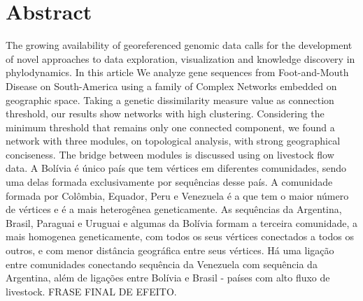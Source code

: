 \documentclass[10pt,letterpaper]{article}
\begin{document}
\section*{Abstract}
The growing availability of georeferenced genomic data calls for the development of novel approaches to data exploration, visualization and knowledge discovery in phylodynamics. In this article We analyze gene sequences from Foot-and-Mouth Disease on South-America using a family of Complex Networks embedded on geographic space. Taking a genetic dissimilarity measure value as connection threshold, our results show networks with high clustering. Considering the minimum threshold that remains only one connected component, we found a network with three modules, on topological analysis, with strong geographical conciseness. The bridge between modules is discussed using on livestock flow data. A Bolívia é único país que tem vértices em diferentes comunidades, sendo uma delas formada exclusivamente por sequências desse país. A comunidade formada por Colômbia, Equador, Peru e Venezuela é a que tem o maior número de vértices e é a mais heterogênea geneticamente. As sequências da Argentina, Brasil, Paraguai e Uruguai e algumas da Bolívia formam a terceira comunidade, a mais homogenea geneticamente, com todos os seus vértices conectados a todos os outros, e com menor distância geográfica entre seus vértices. Há uma ligação entre comunidades conectando sequência da Venezuela com sequência da Argentina, além de ligações entre Bolívia e Brasil - países com alto fluxo de livestock. FRASE FINAL DE EFEITO.



\linenumbers
\end{document}
